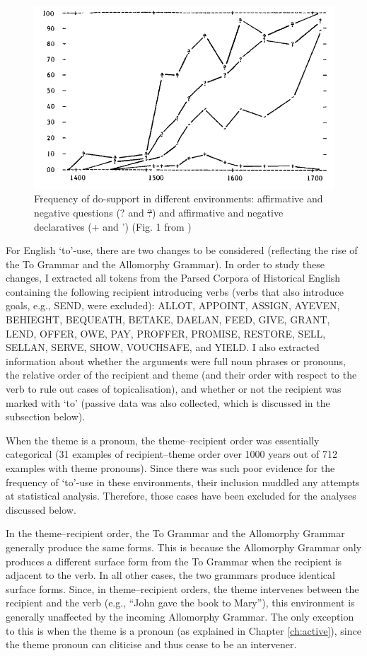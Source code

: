 	\begin{figure}[ht!]
		\includegraphics[width=.5\linewidth]{../images/kroch-graph}
		\caption{Frequency of do-support in different environments: affirmative and negative questions (? and \sout{?}) and affirmative and negative declaratives (+ and ') (Fig. 1 from \citealt{Kroch.1989})}
		\label{fig:kroch-graph}
	\end{figure}

	For English `to'-use, there are two changes to be considered (reflecting the rise of the To Grammar and the Allomorphy Grammar). In order to study these changes, I extracted all tokens from the Parsed Corpora of Historical English \citep{Kroch.2000,Taylor.2003,Kroch.2004,Taylor.2006,Kroch.2010} containing the following recipient introducing verbs (verbs that also introduce goals, e.g., SEND, were excluded): ALLOT, APPOINT, ASSIGN, AYEVEN, BEHIEGHT, BEQUEATH, BETAKE, DAELAN, FEED, GIVE, GRANT, LEND, OFFER, OWE, PAY, PROFFER, PROMISE, RESTORE, SELL, SELLAN, SERVE, SHOW, VOUCHSAFE, and YIELD. I also extracted information about whether the arguments were full noun phrases or pronouns, the relative order of the recipient and theme (and their order with respect to the verb to rule out cases of topicalisation), and whether or not the recipient was marked with `to' (passive data was also collected, which is discussed in the subsection below). 
	
	When the theme is a pronoun, the theme--recipient order was essentially categorical (31 examples of recipient--theme order over 1000 years out of 712 examples with theme pronouns). Since there was such poor evidence for the frequency of `to'-use in these environments, their inclusion muddled any attempts at statistical analysis. Therefore, those cases have been excluded for the analyses discussed below.

	In the theme--recipient order, the To Grammar and the Allomorphy Grammar generally produce the same forms. This is because the Allomorphy Grammar only produces a different surface form from the To Grammar when the recipient is adjacent to the verb. In all other cases, the two grammars produce identical surface forms. Since, in theme--recipient orders, the theme intervenes between the recipient and the verb (e.g., ``John gave the book to Mary''), this environment is generally unaffected by the incoming Allomorphy Grammar. The only exception to this is when the theme is a pronoun (as explained in Chapter \ref{ch:active}), since the theme pronoun can cliticise and thus cease to be an intervener.

